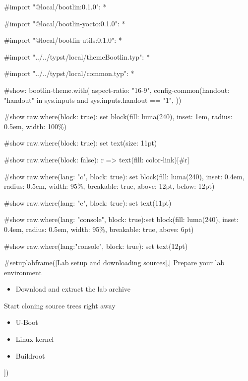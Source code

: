 #import "@local/bootlin:0.1.0": *

#import "@local/bootlin-yocto:0.1.0": *

#import "@local/bootlin-utils:0.1.0": *

#import "../../typst/local/themeBootlin.typ": *

#import "../../typst/local/common.typ": *

#show: bootlin-theme.with( aspect-ratio: "16-9", config-common(handout: "handout" in sys.inputs and sys.inputs.handout == "1", ))

#show raw.where(block: true): set block(fill: luma(240), inset: 1em, radius: 0.5em, width: 100\%)

#show raw.where(block: true): set text(size: 11pt)

#show raw.where(block: false): r => text(fill: color-link)[#r]

#show raw.where(lang: "c", block: true): set block(fill: luma(240), inset: 0.4em, radius: 0.5em, width: 95\%, breakable: true, above: 12pt, below: 12pt)

#show raw.where(lang: "c", block: true): set text(11pt)

#show raw.where(lang: "console", block: true):set block(fill: luma(240), inset: 0.4em, radius: 0.5em, width: 95\%, breakable: true, above: 6pt)

#show raw.where(lang:"console", block: true): set text(12pt)

 #setuplabframe([Lab setup and downloading sources],[
  Prepare your lab environment
  \begin{itemize}
  \item Download and extract the lab archive
  \end{itemize}

  Start cloning source trees right away
  \begin{itemize}
  \item U-Boot
  \item Linux kernel
  \item Buildroot
  \end{itemize}
  ])
